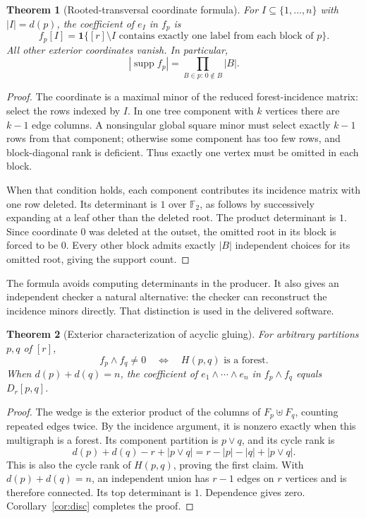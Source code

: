 \documentclass[11pt,a4paper]{article}
\newtheorem{theorem}{Theorem}[section]
\theoremstyle{remark}\newtheorem{remark}[theorem]{Remark}
\newcommand{\F}{\mathbb F_2}
\newcommand{\supp}{\operatorname{supp}}
\newcommand{\one}{\mathbf 1}
\newcommand{\pjoin}{\vee}
\begin{document}
\begin{theorem}[Rooted-transversal coordinate formula]\label{thm:roots}
For $I\subseteq\{1,\ldots,n\}$ with $|I|=d(p)$, the coefficient of $e_I$ in $f_p$ is
\begin{equation}\label{eq:root-coordinate}
 f_p[I]=\one\{[r]\setminus I\text{ contains exactly one label from each block of }p\}.
\end{equation}
All other exterior coordinates vanish. In particular,
\[
 |\supp f_p|=\prod_{B\in p:\,0\notin B}|B|.
\]
\end{theorem}
\begin{proof}
The coordinate is a maximal minor of the reduced forest-incidence matrix: select the rows indexed by $I$. In one tree component with $k$ vertices there are $k-1$ edge columns. A nonsingular global square minor must select exactly $k-1$ rows from that component; otherwise some component has too few rows, and block-diagonal rank is deficient. Thus exactly one vertex must be omitted in each block.

When that condition holds, each component contributes its incidence matrix with one row deleted. Its determinant is $1$ over $\F$, as follows by successively expanding at a leaf other than the deleted root. The product determinant is $1$. Since coordinate $0$ was deleted at the outset, the omitted root in its block is forced to be $0$. Every other block admits exactly $|B|$ independent choices for its omitted root, giving the support count.
\end{proof}

The formula avoids computing determinants in the producer. It also gives an independent checker a natural alternative: the checker can reconstruct the incidence minors directly. That distinction is used in the delivered software.

\begin{theorem}[Exterior characterization of acyclic gluing]\label{thm:wedge}
For arbitrary partitions $p,q$ of $[r]$,
\[
 f_p\wedge f_q\ne0
 \quad\Longleftrightarrow\quad H(p,q)\text{ is a forest}.
\]
When $d(p)+d(q)=n$, the coefficient of $e_1\wedge\cdots\wedge e_n$ in $f_p\wedge f_q$ equals $D_r[p,q]$.
\end{theorem}
\begin{proof}
The wedge is the exterior product of the columns of $F_p\uplus F_q$, counting repeated edges twice. By the incidence argument, it is nonzero exactly when this multigraph is a forest. Its component partition is $p\pjoin q$, and its cycle rank is
\[
 d(p)+d(q)-r+|p\pjoin q|
 =r-|p|-|q|+|p\pjoin q|.
\]
This is also the cycle rank of $H(p,q)$, proving the first claim. With $d(p)+d(q)=n$, an independent union has $r-1$ edges on $r$ vertices and is therefore connected. Its top determinant is $1$. Dependence gives zero. Corollary~\ref{cor:disc} completes the proof.
\end{proof}
\end{document}
